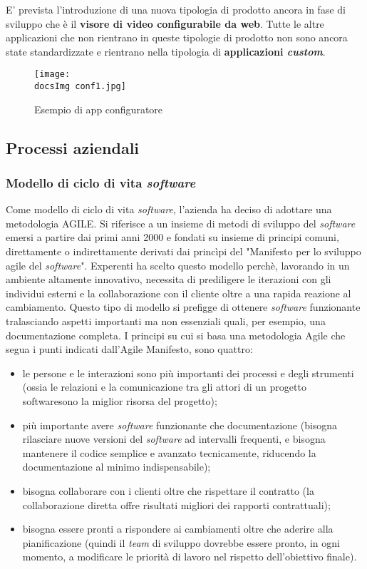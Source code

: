 E' prevista l'introduzione di una nuova tipologia di prodotto ancora in fase di sviluppo che \`e il \textbf{visore di video configurabile da web}. Tutte le altre applicazioni che non rientrano in queste tipologie di prodotto non sono ancora state standardizzate e rientrano nella tipologia di \textbf{applicazioni \textit{custom}}. 

\begin{figure}[H]
	\centering
	\texttt{[image: \\docsImg conf1.jpg]}
	\caption{Esempio di app configuratore}
	\label{fig:Esempio di app configuratore}
\end{figure}



\subsection{Processi aziendali}
\subsubsection{Modello di ciclo di vita \textit{software\gloss}}
Come modello di ciclo di vita \textit{software\gloss}, l'azienda ha deciso di adottare una metodologia AGILE. Si riferisce a un insieme di metodi di sviluppo del \textit{software\gloss} emersi a partire dai primi anni 2000 e fondati su insieme di principi comuni, direttamente o indirettamente derivati dai princìpi del "Manifesto per lo sviluppo agile del \textit{software\gloss}". Experenti ha scelto questo modello perch\`e, lavorando in un ambiente altamente innovativo, necessita di prediligere le iterazioni con gli individui esterni e la collaborazione con il cliente oltre a una rapida reazione al cambiamento. Questo tipo di modello si prefigge di ottenere \textit{software\gloss} funzionante tralasciando aspetti importanti ma non essenziali quali, per esempio, una documentazione completa.
I principi su cui si basa una metodologia Agile che segua i punti indicati dall'Agile Manifesto, sono quattro:
\begin{itemize}
	\item le persone e le interazioni sono più importanti dei processi e degli strumenti (ossia le relazioni e la comunicazione tra gli attori di un progetto software\gloss sono la miglior risorsa del progetto);
	\item  più importante avere \textit{software\gloss} funzionante che documentazione (bisogna rilasciare nuove versioni del \textit{software\gloss} ad intervalli frequenti, e bisogna mantenere il codice semplice e avanzato tecnicamente, riducendo la documentazione al minimo indispensabile);
	\item bisogna collaborare con i clienti oltre che rispettare il contratto (la collaborazione diretta offre risultati migliori dei rapporti contrattuali);
	\item bisogna essere pronti a rispondere ai cambiamenti oltre che aderire alla pianificazione (quindi il \textit{team} di sviluppo dovrebbe essere pronto, in ogni momento, a modificare le priorità di lavoro nel rispetto dell'obiettivo finale).
\end{itemize}

